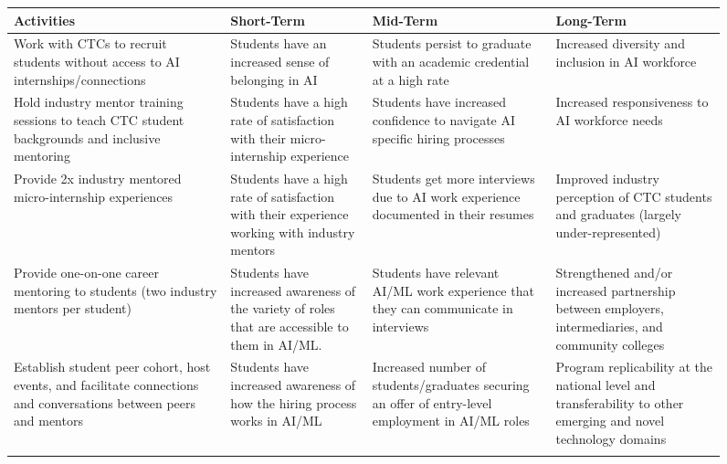 \begin{figure}
    \fontsize{11pt}{11pt}\selectfont
    \begin{tabularx}{\linewidth}{L{0.25} L{0.25} L{0.25} L{0.25}}
        \toprule
        \textbf{Activities} &
        \textbf{Short-Term} &
        \textbf{Mid-Term} &
        \textbf{Long-Term} \\
        \midrule \endhead
        \bottomrule\endfoot
        
        Work with CTCs to recruit students without access to AI internships/connections &
        Students have an increased sense of belonging in AI &
        Students persist to graduate with an academic credential at a high rate &
        Increased diversity and inclusion in AI workforce \\ \addlinespace \hline \addlinespace
        
        Hold industry mentor training sessions to teach CTC student backgrounds and inclusive mentoring &
        Students have a high rate of satisfaction with their micro-internship experience &
        Students have increased confidence to navigate AI specific hiring processes &
        Increased responsiveness to AI workforce needs \\ \addlinespace \hline \addlinespace
        
        Provide 2x industry mentored micro-internship experiences &
        Students have a high rate of satisfaction with their experience working with industry mentors &
        Students get more interviews due to AI work experience documented in their resumes &
        Improved industry perception of CTC students and graduates (largely under-represented)  \\ \addlinespace \hline \addlinespace
        
        Provide one-on-one career mentoring to students (two industry mentors per student) &
        Students have increased awareness of the variety of roles that are accessible to them in AI/ML. &
        Students have relevant AI/ML work experience that they can communicate in interviews &
        Strengthened and/or increased partnership between employers, intermediaries, and community colleges  \\ \addlinespace \hline \addlinespace
        
        Establish student peer cohort, host events, and facilitate connections and conversations between peers and mentors &
        Students have increased awareness of how the hiring process works in AI/ML &
        Increased number of students/graduates securing an offer of entry-level employment in AI/ML roles &
        Program replicability at the national level and transferability to other emerging and novel technology domains  \\ \addlinespace \hline \addlinespace
        

\end{tabularx}
\end{figure}
